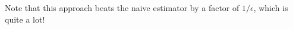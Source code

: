 \documentclass[10pt]{article}
\newcommand{\bv}[1]{\mathbf{#1}}
\newcommand{\R}{\mathbb{R}}
\DeclareMathOperator{\rank}{rank}
\begin{document}
Note that this approach beats the naive estimator by a factor of $1/\epsilon$, which is quite a lot!



%
%
%
\end{document}
